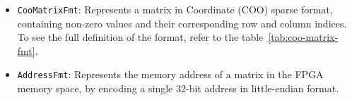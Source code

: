 \documentclass[12pt,oneside,a4paper]{article}
\begin{document}
\begin{itemize}
    \item \texttt{CooMatrixFmt}: Represents a matrix in Coordinate (COO) sparse format, containing non-zero values and their corresponding row and column indices. To see the full definition of the format, refer to the table~\ref{tab:coo-matrix-fmt}.
    \item \texttt{AddressFmt}: Represents the memory address of a matrix in the FPGA memory space, by encoding a single 32-bit address in little-endian format.
\end{itemize}

\begin{table}
    \caption{COO Matrix Format}
    \centering
    \label{tab:coo-matrix-fmt}
\end{table}


\begin{table}
    \caption{COO Element Format}
    \centering
    \label{tab:coo-el-fmt}
\end{table}

\FloatBarrier
\end{document}
